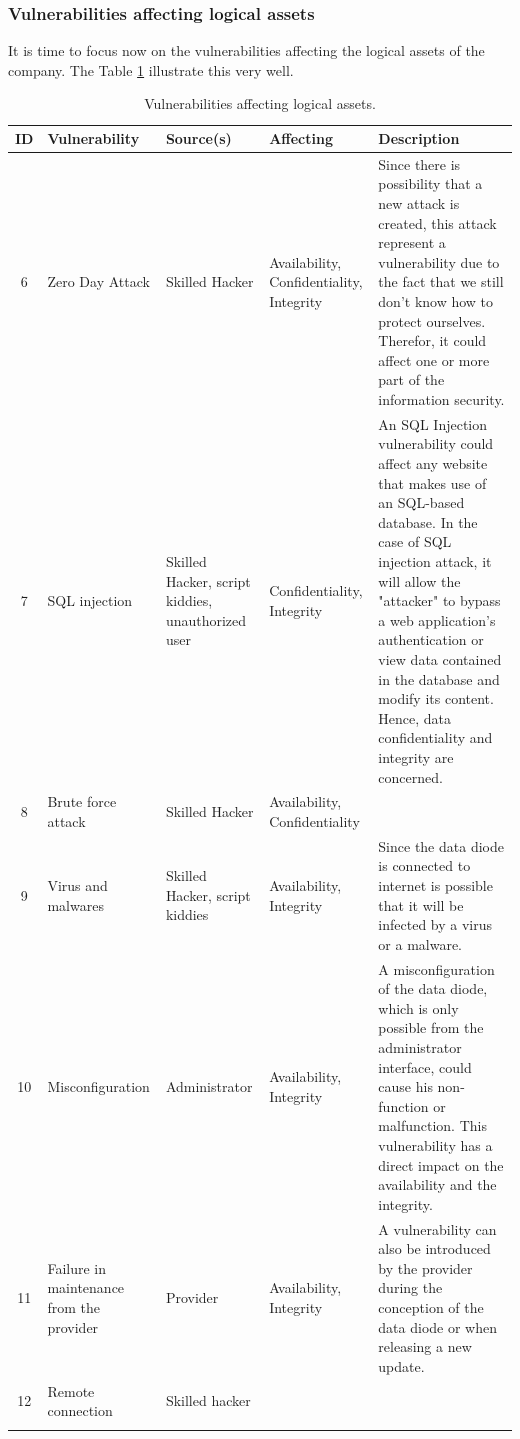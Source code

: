 \documentclass[a4paper,10pt]{article}
\begin{document}
\subsubsection{Vulnerabilities affecting logical assets}
It is time to focus now on the vulnerabilities affecting the logical assets of the company. The Table \ref{tab:logic-assets} illustrate this very well.

\begin{longtable}{|c|p{2.5cm}|p{2.5cm}|p{2.5cm}|p{6.5cm}|}
\hline
\textbf{ID}&  \textbf{Vulnerability} & \textbf{Source(s)} & \textbf{Affecting} & \textbf{Description} \\
\hline
6 & Zero Day Attack & Skilled Hacker & Availability, Confidentiality, Integrity & Since there is possibility that a new attack is created, this attack represent a vulnerability due to the fact that we still don't know how to protect ourselves. Therefor, it could affect one or more part of the information security. \\
\hline
7 &  SQL injection  & Skilled Hacker, script kiddies, unauthorized user & Confidentiality, Integrity & An SQL Injection vulnerability could affect any website that makes use of an SQL-based database.
In the case of SQL injection attack, it will allow the "attacker" to bypass a web application's authentication or view data contained in the database and modify its content. Hence, data confidentiality and integrity are concerned.\\
\hline
8 & Brute force attack & Skilled Hacker & Availability, Confidentiality  & \\
\hline
9 & Virus and malwares & Skilled Hacker, script kiddies  & Availability, Integrity & Since the data diode is connected to internet is possible that it will be infected by a virus or a malware. \\
\hline
10 & Misconfiguration & Administrator & Availability, Integrity & A misconfiguration of the data diode, which is only possible from the administrator interface, could cause his non-function or malfunction. This vulnerability has a direct impact on the availability and the integrity. \\
\hline
11 &  Failure in maintenance from the provider & Provider  & Availability, Integrity  & A vulnerability can also be introduced by the provider during the conception of the data diode or when releasing a new update. \\
\hline
12 &  Remote connection & Skilled hacker &  & \\
\hline
\caption{Vulnerabilities affecting logical assets.}
\label{tab:logic-assets}
\end{longtable}
\end{document}

